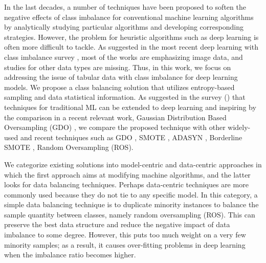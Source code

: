 \documentclass[journal]{IEEEtai}
\begin{document}
In the last decades, a number of techniques have been proposed to soften the negative effects of class imbalance for conventional machine learning algorithms by analytically studying particular algorithms and developing corresponding strategies. However, the problem for heuristic algorithms such as deep learning is often more difficult to tackle. As suggested in the most recent deep learning with class imbalance survey \cite{johnson_survey_2019}, most of the works are emphasizing image data, and studies for other data types are missing. Thus, in this work, we focus on addressing the issue of tabular data with class imbalance for deep learning models. We propose a class balancing solution that utilizes entropy-based sampling and data statistical information. As suggested in the survey (\cite{johnson_survey_2019}) that techniques for traditional ML can be extended to deep learning and inspiring by the comparison in a recent relevant work, Gaussian Distribution Based Oversampling (GDO) \cite{bib:GDO}, we compare the proposed technique with other widely-used and recent techniques such as GDO \cite{bib:GDO}, SMOTE \cite{chawla_smote:_2002}, ADASYN \cite{ADASYN}, Borderline SMOTE \cite{bordersmote}, Random Oversampling (ROS). 

We categorize existing solutions into model-centric and data-centric approaches in which the first approach aims at modifying machine algorithms, and the latter looks for data balancing techniques. Perhaps data-centric techniques are more commonly used because they do not tie to any specific model. In this category, a simple data balancing technique is to duplicate minority instances to balance the sample quantity between classes, namely random oversampling (ROS). This can preserve the best data structure and reduce the negative impact of data imbalance to some degree. However, this puts too much weight on a very few minority samples; as a result, it causes over-fitting problems in deep learning when the imbalance ratio becomes higher. 
\end{document}
